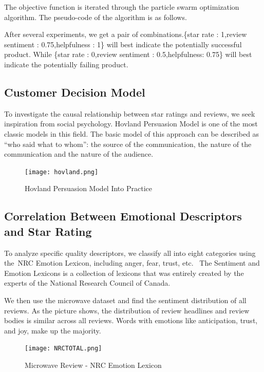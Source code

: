 \documentclass[12pt]{article}  %
\begin{document}
The objective function is iterated through the particle swarm optimization algorithm. The pseudo-code of the algorithm is as follows.

\newpage


After several experiments, we get a pair of combinations.\{star rate : 1,review sentiment : 0.75,helpfulness : 1\} will best indicate the  potentially successful product. While \{star rate : 0,review sentiment : 0.5,helpfulness: 0.75\} will best indicate the  potentially failing product.


\subsection{Customer Decision Model}

To investigate the causal relationship between star ratings and reviews, we seek inspiration from social psychology. Hovland Persuasion Model is one of the most classic models in this field. The basic model of this approach can be described as ``who said what to whom'': the source of the communication, the nature of the communication and the nature of the audience\cite{social2010}.
\begin{figure}[h]
	\centering
	\texttt{[image: hovland.png]}
	\caption{Hovland Persuasion Model Into Practice}\label{fig:fig13}
\end{figure} 

\subsection{Correlation Between Emotional Descriptors and Star Rating}

To analyze specific quality descriptors, we classify all into eight categories using the NRC Emotion Lexicon, including anger, fear, trust, etc. 
The Sentiment and Emotion Lexicons is a collection of lexicons that was entirely created by the experts of the National Research Council of Canada\cite{sentiment.nrc.ca}.

We then use the microwave dataset and find the sentiment distribution of all reviews. As the picture shows, the distribution of review headlines and review bodies is similar across all reviews. Words with emotions like anticipation, trust, and joy, make up the majority. 

\begin{figure}[htbp]
	\centering
	\texttt{[image: NRCTOTAL.png]}
	\caption{Microwave Review - NRC Emotion Lexicon }\label{fig:fig14}
\end{figure}
\end{document}
